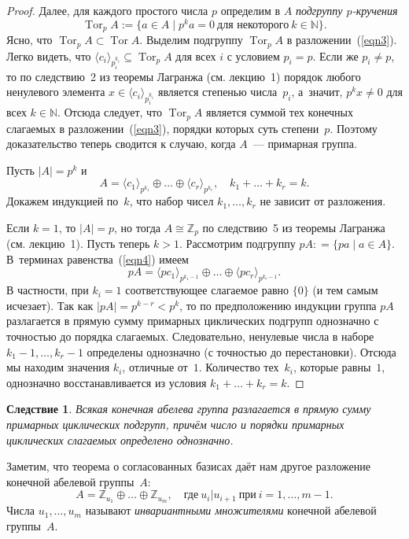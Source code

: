 \documentclass[a4paper,10pt]{amsart}
\DeclareMathOperator{\Tor}{\mathrm{Tor}}
\def\ZZ{{\mathbb Z}}%
\def\NN{{\mathbb N}}%
\newtheorem{corollary}{Следствие}
\theoremstyle{definition}
\theoremstyle{remark}
\begin{document}
\begin{proof}
Далее, для каждого простого числа $p$ определим в $A$ {\it подгруппу
$p$-кручения}
\begin{equation} \label{eqn4}
\Tor_p A := \{ a\in A \mid p^ka=0 \ \text{для некоторого} \ k \in
\NN \}.
\end{equation}
Ясно, что $\Tor_p A \subset \Tor A$. Выделим подгруппу $\Tor_p A$ в
разложении~(\ref{eqn3}). Легко видеть, что $\langle c_i
\rangle_{p_i^{k_i}} \subseteq \Tor_p A$ для всех $i$ с условием $p_i
= p$. Если же $p_i \ne p$, то по следствию~2 из теоремы Лагранжа
(см. лекцию~1) порядок любого ненулевого элемента $x \in \langle c_i
\rangle_{p_i^{k_i}}$ является степенью числа~$p_i$, а~значит, $p^k x
\ne 0$ для всех $k \in \NN$. Отсюда следует, что $\Tor_p A$ является
суммой тех конечных слагаемых в разложении~(\ref{eqn3}), порядки
которых суть степени~$p$. Поэтому доказательство теперь сводится к
случаю, когда $A$~--- примарная группа.

Пусть $|A|=p^k$ и
$$
A = \langle c_1\rangle_{p^{k_1}}\oplus\ldots\oplus\langle
c_r\rangle_{p^{k_r}}, \quad k_1+\ldots+k_r=k.
$$
Докажем индукцией по~$k$, что набор чисел $k_1, \ldots, k_r$ не
зависит от разложения.

Если $k = 1$, то $|A| = p$, но тогда $A \cong \ZZ_p$ по следствию~5
из теоремы Лагранжа (см. лекцию~1). Пусть теперь $k > 1$. Рассмотрим
подгруппу $pA: = \{ pa \mid a \in A \}$. В~терминах
равенства~(\ref{eqn4}) имеем
$$
pA = \langle pc_1 \rangle_{p^{k_1-1}} \oplus \ldots \oplus \langle
pc_r\rangle_{p^{k_r-1}}.
$$
В частности, при $k_i = 1$ соответствующее слагаемое равно $\lbrace
0 \rbrace$ (и тем самым исчезает). Так как $|pA| = p^{k - r} < p^k$,
то по предположению индукции группа $pA$ разлагается в прямую сумму
примарных циклических подгрупп однозначно с точностью до порядка
слагаемых. Следовательно, ненулевые числа в наборе $k_1 - 1, \ldots,
k_r-1$ определены однозначно (с точностью до перестановки). Отсюда
мы находим значения $k_i$, отличные от~$1$. Количество тех~$k_i$,
которые равны~$1$, однозначно восстанавливается из условия $k_1 +
\ldots + k_r = k$.
\end{proof}

\begin{corollary}
Всякая конечная абелева группа разлагается в прямую сумму примарных
циклических подгрупп, причём число и порядки примарных циклических
слагаемых определено однозначно.
\end{corollary}

Заметим, что теорема о согласованных базисах даёт нам другое
разложение конечной абелевой группы~$A$:
\begin{equation} \label{eqn5}
A=\ZZ_{u_1}\oplus\ldots\oplus\ZZ_{u_m}, \quad \text{где} \
u_i|u_{i+1} \ \text{при} \ i = 1, \ldots, m-1.
\end{equation}
Числа $u_1, \ldots, u_m$ называют {\it инвариантными множителями}
конечной абелевой группы~$A$.
\end{document}
